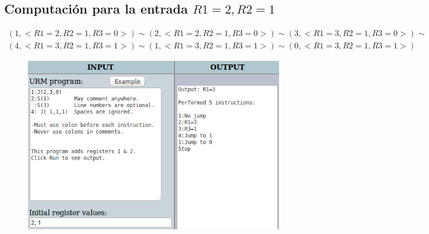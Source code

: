 		\subsection{Computación para la entrada $R1=2, R2=1$}
		\begin{equation*}\begin{gathered}
		(1, <R1=2, R2=1, R3=0>) \sim (2, <R1=2, R2=1, R3=0>) \sim (3, <R1=3, R2=1, R3=0>) \sim\\
		(4, <R1=3, R2=1, R3=1>) \sim (1, <R1=3, R2=1, R3=1>) \sim (0, <R1=3, R2=1, R3=1>)
		\end{gathered}\end{equation*}
		\begin{figure}[H]
  			\centering
  			\includegraphics[scale=0.5]{images/121.png}
  		\end{figure}
